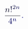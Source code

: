 \documentclass[12pt]{article}
\begin{document}
\makeatletter
\renewcommand*{\@textcolor}[3]{%
  \protect\leavevmode
  \begingroup
    \color#1{#2}#3%
  \endgroup
}
\makeatother
\begin{displaymath}
\mathcolor[RGB]{0,0,15}{\frac { \mathcolor[RGB]{0,0,30}{n} \mathcolor[RGB]{0,0,45}{!} ^ { \mathcolor[RGB]{0,0,60}{2} \mathcolor[RGB]{0,0,75}{n} } } { \mathcolor[RGB]{0,0,90}{4} ^ { \mathcolor[RGB]{0,0,105}{n} } } } \mathcolor[RGB]{0,0,120}{.}
\end{displaymath}
\end{document}
